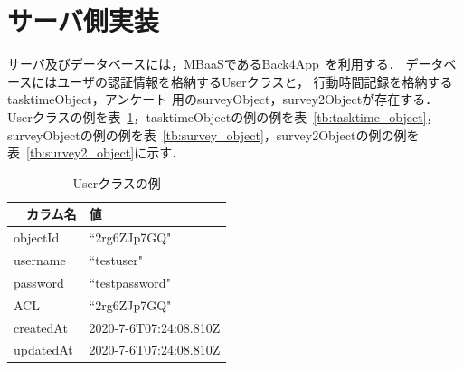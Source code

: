\section{サーバ側実装}
サーバ及びデータベースには，MBaaSであるBack4App~\cite{back4app}を利用する．
データベースにはユーザの認証情報を格納するUserクラスと， 行動時間記録を格納するtasktimeObject，アンケート 用のsurveyObject，survey2Objectが存在する．
Userクラスの例を表~\ref{tb:user_class}，tasktimeObjectの例の例を表~\ref{tb:tasktime_object}，surveyObjectの例の例を表~\ref{tb:survey_object}，survey2Objectの例の例を表~\ref{tb:survey2_object}に示す．

\begin{table}[htb]
\begin{center}
  \begin{tabular}{|l|l|} \hline
 　カラム名 & 値 \\ \hline
    objectId & ``2rg6ZJp7GQ" \\
    username & ``testuser" \\
    password & ``testpassword" \\
    ACL & ``2rg6ZJp7GQ" \\
   createdAt & 2020-7-6T07:24:08.810Z  \\
   updatedAt & 2020-7-6T07:24:08.810Z \\ \hline
  \end{tabular}
  \caption{Userクラスの例}
  \label{tb:user_class}
\end{center}
\end{table}

